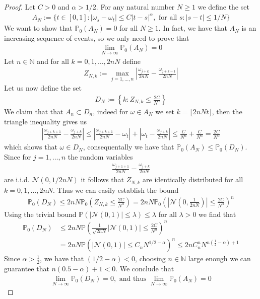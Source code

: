 \documentclass[11pt,a4paper, final]{article}
\theoremstyle{definition}
\begin{document}
\begin{proof}
Let $C>0$ and $\alpha > 1/2$. For any natural number $N \geq 1$ we define the set 
\begin{align*}
A_N:= \lbrace t \in [0,1] : |\omega_s- \omega_t| \leq C |t-s|^\alpha, \text{ for all $s$}: |s-t| \leq 1/N \rbrace 
\end{align*}
We want to show that $\mathbb{P}_0(A_N)=0$ for all $N \geq 1$. In fact, we have that $A_N$ is an increasing sequence of events, so we only need to prove that  
\begin{align*}
\lim_{N \to \infty} \mathbb{P}_0(A_N)=0 
\end{align*}
Let $n \in \mathbb{N}$ and for all $k = 0, 1 , \dots , 2nN$ define
\begin{align*}
Z_{N,k}:= \max_{j=1, \dots , n} \left| \frac{\omega_{j+k}}{2nN} - \frac{\omega_{j+k-1}}{2nN} \right| 
\end{align*}
Let us now define the set \begin{align*}
D_N:= \left\lbrace k : Z_{N,k} \leq \frac{2C}{N^\alpha} \right\rbrace 
\end{align*}
We claim that that $A_n \subset D_n$, indeed for $ \omega \in A_N$ we set $k = \lfloor 2nNt \rfloor$, then the triangle inequality gives us
\begin{align*}
\left| \frac{\omega_{j+k+1}}{2nN} - \frac{\omega_{j+k}}{2nN} \right| \leq \left| \frac{\omega_{j+k+1}}{2nN}- \omega_t \right| + \left| \omega_t - \frac{\omega_{j+k}}{2nN} \right| \leq \frac{C}{N^\alpha} + \frac{C}{N^\alpha} = \frac{2C}{N^\alpha}
\end{align*}
which shows that $\omega \in D_N$, consequentally we have that $\mathbb{P}_0(A_N) \leq \mathbb{P}_0(D_N)$. 
\newpage
Since for $j=1, \dots , n$ the random variables 
\begin{align*}
\frac{\omega_{j+1+1}}{2nN} - \frac{\omega_{j+k}}{2nN}
\end{align*}
are i.i.d. $\mathcal{N}(0, 1/2nN)$ it follows that $Z_{N,k}$ are identically distributed for all $k=0, 1, \dots , 2nN$. Thus we can easily establish the bound
\begin{align*}
\mathbb{P}_0(D_N) \leq 2nN \mathbb{P}_0 \left( Z_{N,k} \leq \frac{2C}{N^\alpha} \right) = 2nN \mathbb{P}_0 \left( \left| \mathcal{N} \left( 0, \frac{1}{2nN} \right) \right| \leq \frac{2C}{N^\alpha} \right)^n 
\end{align*}
Using the trivial bound $\mathbb{P}(| \mathcal{N}(0,1)| \leq \lambda ) \leq \lambda$ for all $\lambda >0$ we find that
\begin{align*}
\mathbb{P}_0(D_N) &\leq 2nN \mathbb{P} \left(\frac{1}{\sqrt{2nN}} | \mathcal{N}(0,1)| \leq \frac{2C}{N^\alpha} \right)^n \\
& = 2nN \mathbb{P}( | \mathcal{N}(0,1) | \leq C_n N^{1/2- \alpha} ) ^n \leq 2nC_n^n N^{n \left( \frac{1}{2}- \alpha \right)+1} 
\end{align*}
Since $\alpha > \frac{1}{2}$, we have that $(1/2 - \alpha) < 0$, choosing $n \in \mathbb{N}$ large enough we can guarantee that $n(0.5- \alpha) +1 <0 $. We conclude that 
\begin{align*}
\lim_{N \to \infty} \mathbb{P}_0 (D_N)=0, \text{ and thus } \lim_{N \to \infty} \mathbb{P}_0(A_N)=0
\end{align*}
\end{proof}
\end{document}

